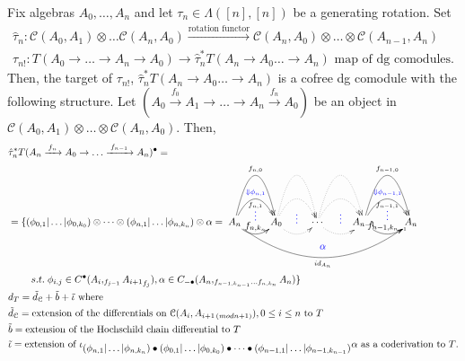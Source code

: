 %
%
\begin{eg}
\label{eg:pb5}
Fix algebras $A_0, \dots, A_n$ and let 
$\tau_n \in \Lambda([n],[n])$ 
be a generating rotation. Set
\begin{align*}
\hat{\tau}_n:
\mathcal{C}(A_0,A_1) \otimes 
\dots \mathcal{C}(A_n,A_0) 
\xrightarrow{\textrm{rotation functor}}
\mathcal{C}(A_n,A_0) \otimes 
\dots \otimes \mathcal{C}(A_{n-1},A_n)\\
\tau_{n!}: T(A_0 \to \dots \to A_n \to A_0)
\to \hat{\tau}_n^* T(A_n \to A_0 \dots \to A_n) 
\textrm{ map of dg comodules.}
\end{align*}
Then, the target of $\tau_{n!}$, 
$\hat{\tau}_n^* T(A_n \to A_0 \dots \to A_n)$ 
is a cofree dg comodule with the following 
structure. Let 
$(A_0 \xrightarrow{f_0} A_1 \to \dots \to 
A_n \xrightarrow{f_n} A_0)$ be an object 
in $\mathcal{C}(A_0,A_1) \otimes \dots \otimes 
\mathcal{C}(A_n, A_0)$. Then,
\begin{align*}
&\hat{\tau}_n^* 
  T(A_n \xrightarrow{f_n} A_0 \to \dots 
  \xrightarrow{f_{n-1}} A_n)^\bullet = \\
&= \{
  (\phi_{0,1}|\dots|\phi_{0,k_0}) \otimes \dots \otimes
  (\phi_{n,1}|\dots|\phi_{n,k_n}) \otimes \alpha =
  \xymatrix{
  A_n \ar@/^4pc/[r]^{f_{n,0}} 
  \ar@/^2pc/[r]^{\textcolor{blue}{\Downarrow \phi_{n,1}}}_{f_{n,1}} 
  \ar@/_1pc/[r]^{\substack{\textcolor{blue}{\vdots}\\ f_{n,k_n}}}
  \ar@/_3pc/[rrrr]^{\substack{\textcolor{blue}{\alpha} \\\\}}_{ id_{A_n}}
  & A_0 \ar@{.>}@/^4pc/[r] 
  \ar@{.>}@/^2pc/[r]_{\substack{\\ \\ \textcolor{blue}{\vdots}}} 
  \ar@{.>}@/_1pc/[r]
  & \cdots \ar@{.>}@/^4pc/[r] 
  \ar@{.>}@/^2pc/[r]_{\substack{\\ \\ \textcolor{blue}{\vdots}}} 
  \ar@{.>}@/_1pc/[r]
  & A_{n-1} \ar@/^4pc/[r]^{f_{n-1,0}} 
  \ar@/^2pc/[r]^{\textcolor{blue}{\Downarrow \phi_{n-1,1}}}_{f_{n-1,1}} 
  \ar@/_1pc/[r]^{\substack{\textcolor{blue}{\vdots}\\ f_{n-1,k_{n-1}}}}
  & A_n 
  }\\
&\phantom{move}
   s.t.\; \phi_{i,j} \in C^\bullet(A_i, _{f_{j-1}} {A_{i+1}}_{f_j}),
    \alpha \in C_{-\bullet}(A_n, _{f_{n-1,k_{n-1}}\dots f_{n,k_n}} A_n)\}\\
&d_{T} = 
  \tilde{d}_{\mathcal{C}} + \tilde{b} + \tilde{\iota} 
  \textrm{ where}\\
&\tilde{d}_{\mathcal{C}} = 
  \textrm{extension of the differentials on 
  $\mathcal{C}(A_i,A_{i+1 \, (mod n+1)}), 0 \leq i \leq n$ to $T$}\\
&\tilde{b} =
  \textrm{extension of the Hochschild chain differential to $T$}\\
&\tilde{\iota} = 
  \textrm{extension of $\iota_{\scriptstyle (\phi_{n,1}|\dots|\phi_{n,k_n}) \bullet (\phi_{0,1}|\dots|\phi_{0,k_0}) 
    \bullet \dots \bullet (\phi_{n-1,1}|\dots|\phi_{n-1,k_{n-1}}) } \alpha$ as a coderivation to $T$.}
\end{align*}
\end{eg}